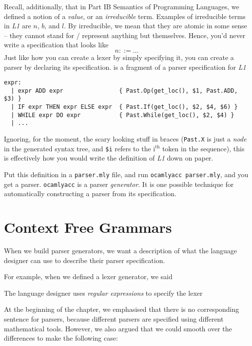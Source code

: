 Recall, additionally, that in \textsf{Part IB Semantics of Programming Languages}, we defined a notion of a \textit{value}, or an \textit{irreducible} term. Examples of irreducible terms in \textit{L1} are $n$, $b$, and $l$. By irreducible, we mean that they are atomic in some sense -- they cannot stand for / represent anything but themselves. Hence, you'd never write a specification that looks like
\[ n ::= \ldots \]
Just like how you can create a lexer by simply specifying it, you can create a parser by declaring its specification.  is a fragment of a parser specification for \textit{L1}

\begin{code}
\label{listing:parser-spec-l1}
\begin{verbatim}
expr:
  | expr ADD expr                { Past.Op(get_loc(), $1, Past.ADD, $3) }
  | IF expr THEN expr ELSE expr  { Past.If(get_loc(), $2, $4, $6) }
  | WHILE expr DO expr           { Past.While(get_loc(), $2, $4) }
  | ...
\end{verbatim}
\end{code}
Ignoring, for the moment, the scary looking stuff in braces (\texttt{Past.X} is just a \textit{node} in the generated syntax tree, and \texttt{\$i} refers to the $\text{i}^\text{th}$ token in the sequence), this is effectively how you would write the definition of \textit{L1} down on paper. 

Put this definition in a \texttt{parser.mly} file, and run \texttt{ocamlyacc parser.mly}, and you get a parser. \texttt{ocamlyacc} is a parser \textit{generator}. It is one possible technique for automatically constructing a parser from its specification.

\section{Context Free Grammars}\label{section:context-free-grammars}
When we build parser generators, we want a description of what the language designer can use to describe their parser specification. 

For example, when we defined a lexer generator, we said

\begin{center}
    The language designer uses \textit{regular expressions} to specify the lexer
\end{center}

At the beginning of the chapter, we emphasised that there is no corresponding sentence for parsers, because different parsers are specified using different mathematical tools. However, we also argued that we could smooth over the differences to make the following case:

